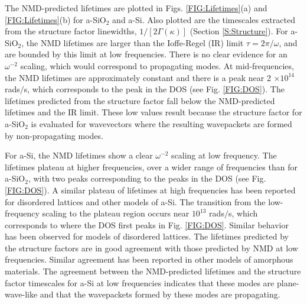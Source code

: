 \documentclass[aps,prb,onecolumn,preprint,superscriptaddress,footinbib,amsmath,amssymb,floatfix]{revtex4}
\begin{document}
The NMD-predicted lifetimes are plotted in Figs. 
\ref{FIG:Lifetimes}(a) and \ref{FIG:Lifetimes}(b) 
for a-SiO$_2$ and a-Si. 
Also plotted are the timescales extracted from the structure 
factor linewidths, $1/[2\Gamma(\kappa)]$ (Section \ref{S:Structure}). 
For a-SiO$_2$, the NMD lifetimes are larger than 
the Ioffe-Regel (IR) limit $\tau = 2\pi/\omega$,
\cite{taraskin_determination_1999} and are bounded by  
this limit at low frequencies. There is no clear evidence for an 
$\omega^{-2}$ scaling, which would correspond to propagating modes.  
At mid-frequencies, the NMD lifetimes are approximately constant and  
there is a peak near 2 $\times 10^{14}$ rads$/$s, which corresponds to 
the peak in the DOS (see Fig. \ref{FIG:DOS}). 
The lifetimes predicted from the 
structure factor fall below the NMD-predicted lifetimes 
and the IR limit. These low values result because the structure factor 
for a-SiO$_2$ is evaluated for wavevectors where the resulting 
wavepackets are formed by non-propagating modes.
\cite{feldman_thermal_1993,feldman_numerical_1999,allen_diffusons_1999}

For a-Si, the NMD lifetimes show a clear $\omega^{-2}$ 
scaling at low frequency. 
The lifetimes plateau at higher frequencies,
over a wider range of frequencies than for a-SiO$_2$, with two peaks 
corresponding to the peaks in the DOS (see Fig. \ref{FIG:DOS}). 
A similar plateau of lifetimes at high frequencies has been 
reported for disordered lattices
\cite{sheng_heat_1991,he_lattice_2012,larkin_predicting_2013} and 
other models of a-Si.\cite{he_heat_2011} 
The transition from the low-frequency scaling to 
the plateau region occurs near 
$10^{13}$ rads$/$s, which corresponds to where the DOS first peaks 
in Fig. \ref{FIG:DOS}. 
Similar behavior has been observed for models of disordered lattices.
\cite{larkin_predicting_2013} The lifetimes predicted by the 
structure factors are in good agreement with those predicted by NMD 
at low frequencies. Similar agreement has been reported in other 
models of amorphous materials.
\cite{mazzacurati_low-frequency_1996,bickham_calculation_1998,
bickham_numerical_1999,feldman_numerical_1999} 
The agreement between the 
NMD-predicted lifetimes and the structure factor timescales for a-Si 
at low frequencies indicates that these modes are plane-wave-like 
and that the wavepackets formed by these modes are propagating.
\cite{feldman_thermal_1993,feldman_numerical_1999,allen_diffusons_1999}
\end{document}
